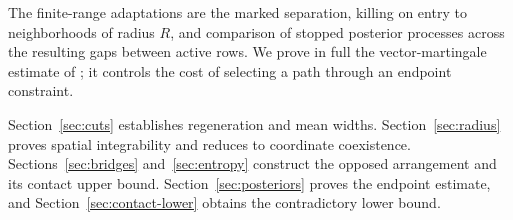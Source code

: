 \documentclass[11pt]{article}
\numberwithin{equation}{section}
\theoremstyle{definition}
\theoremstyle{remark}
\begin{document}
The finite-range adaptations are the marked separation, killing on entry
to neighborhoods of radius $R$, and comparison of stopped posterior
processes across the resulting gaps between active rows.
We prove in full the vector-martingale estimate of
\cite[Lemma~6.1]{OpenAI2026}; it controls the cost of selecting a path
through an endpoint constraint.

Section~\ref{sec:cuts} establishes regeneration and mean widths.
Section~\ref{sec:radius} proves spatial integrability and reduces to
coordinate coexistence. Sections~\ref{sec:bridges} and~\ref{sec:entropy}
construct the opposed arrangement and its contact upper bound.
Section~\ref{sec:posteriors} proves the endpoint estimate, and
Section~\ref{sec:contact-lower} obtains the contradictory lower bound.








\end{document}
